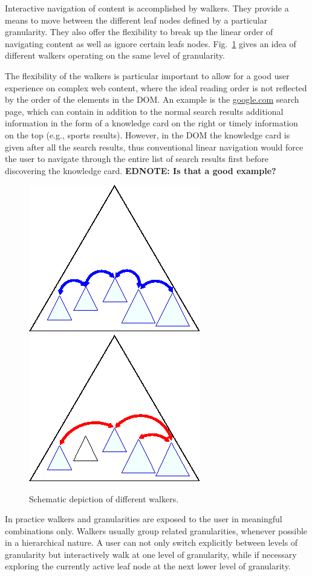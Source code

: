 \documentclass{acm_proc_article-sp}
\newcommand\ednote[1]{\typeout{There is still a note!!!}%
  {\bf EDNOTE: #1}}
\begin{document}
Interactive navigation of content is accomplished by walkers.  They provide a
means to move between the different leaf nodes defined by a particular
granularity. They also offer the flexibility to break up the linear order of
navigating content as well as ignore certain leafs nodes. Fig.~\ref{fig:walkers} gives
an idea of different walkers operating on the same level of granularity.

The flexibility of the walkers is particular important to allow for a good user
experience on complex web content, where the ideal reading order is not
reflected by the order of the elements in the DOM. An example is the
\url{google.com} search page, which can contain in addition to the normal search
results additional information in the form of a knowledge card on the right or
timely information on the top (e.g., sports results). However, in the DOM the
knowledge card is given after all the search results, thus conventional linear
navigation would force the user to navigate through the entire list of search
results first before discovering the knowledge card.\ednote{Is that a good
  example?}

\begin{figure}[ht!]
  \begin{center}
    \leavevmode
    \includegraphics[width=.4\columnwidth]{images/walker1}
    \includegraphics[width=.4\columnwidth]{images/walker2}
    \caption{Schematic depiction of different walkers.}
    \label{fig:walkers}
  \end{center}
\end{figure}

In practice walkers and granularities are exposed to the user in meaningful
combinations only. Walkers usually group related granularities, whenever
possible in a hierarchical nature.  A user can not only switch explicitly
between levels of granularity but interactively walk at one level of
granularity, while if necessary exploring the currently active leaf node at the
next lower level of granularity.
\end{document}
